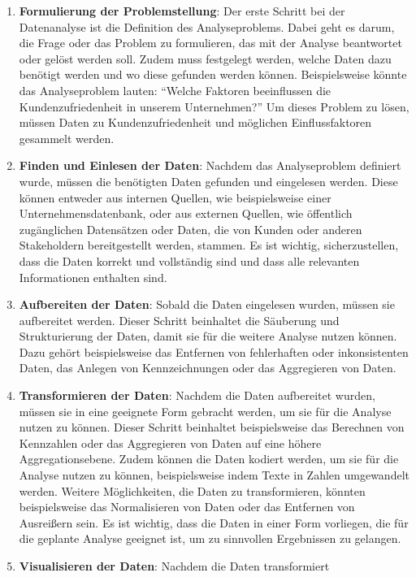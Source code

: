\documentclass[
  letterpaper,
  DIV=11]{scrreprt}
\begin{document}
\begin{enumerate}
\def\labelenumi{\arabic{enumi}.}
\item
  \textbf{Formulierung der Problemstellung}: Der erste Schritt bei der
  Datenanalyse ist die Definition des Analyseproblems. Dabei geht es
  darum, die Frage oder das Problem zu formulieren, das mit der Analyse
  beantwortet oder gelöst werden soll. Zudem muss festgelegt werden,
  welche Daten dazu benötigt werden und wo diese gefunden werden können.
  Beispielsweise könnte das Analyseproblem lauten: ``Welche Faktoren
  beeinflussen die Kundenzufriedenheit in unserem Unternehmen?'' Um
  dieses Problem zu lösen, müssen Daten zu Kundenzufriedenheit und
  möglichen Einflussfaktoren gesammelt werden.
\item
  \textbf{Finden und Einlesen der Daten}: Nachdem das Analyseproblem
  definiert wurde, müssen die benötigten Daten gefunden und eingelesen
  werden. Diese können entweder aus internen Quellen, wie beispielsweise
  einer Unternehmensdatenbank, oder aus externen Quellen, wie öffentlich
  zugänglichen Datensätzen oder Daten, die von Kunden oder anderen
  Stakeholdern bereitgestellt werden, stammen. Es ist wichtig,
  sicherzustellen, dass die Daten korrekt und vollständig sind und dass
  alle relevanten Informationen enthalten sind.
\item
  \textbf{Aufbereiten der Daten}: Sobald die Daten eingelesen wurden,
  müssen sie aufbereitet werden. Dieser Schritt beinhaltet die Säuberung
  und Strukturierung der Daten, damit sie für die weitere Analyse nutzen
  können. Dazu gehört beispielsweise das Entfernen von fehlerhaften oder
  inkonsistenten Daten, das Anlegen von Kennzeichnungen oder das
  Aggregieren von Daten.
\item
  \textbf{Transformieren der Daten}: Nachdem die Daten aufbereitet
  wurden, müssen sie in eine geeignete Form gebracht werden, um sie für
  die Analyse nutzen zu können. Dieser Schritt beinhaltet beispielsweise
  das Berechnen von Kennzahlen oder das Aggregieren von Daten auf eine
  höhere Aggregationsebene. Zudem können die Daten kodiert werden, um
  sie für die Analyse nutzen zu können, beispielsweise indem Texte in
  Zahlen umgewandelt werden. Weitere Möglichkeiten, die Daten zu
  transformieren, könnten beispielsweise das Normalisieren von Daten
  oder das Entfernen von Ausreißern sein. Es ist wichtig, dass die Daten
  in einer Form vorliegen, die für die geplante Analyse geeignet ist, um
  zu sinnvollen Ergebnissen zu gelangen.
\item
  \textbf{Visualisieren der Daten}: Nachdem die Daten transformiert

\end{enumerate}
\end{document}
